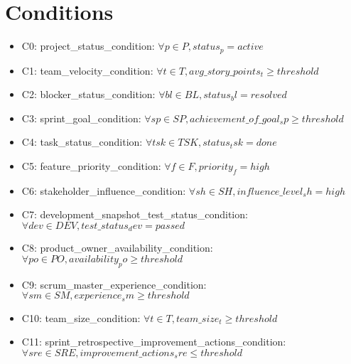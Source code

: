 \documentclass{article}
\begin{document}
\section{Conditions}
\begin{itemize}
    \item C0: project\_status\_condition: $\forall p \in P, status_p = active$
    \item C1: team\_velocity\_condition: $\forall t \in T, avg\_story\_points_t \geq threshold$
    \item C2: blocker\_status\_condition: $\forall bl \in BL, status_bl = resolved$
    \item C3: sprint\_goal\_condition: $\forall sp \in SP, achievement\_of\_goal_sp \geq threshold$
    \item C4: task\_status\_condition: $\forall tsk \in TSK, status_tsk = done$
    \item C5: feature\_priority\_condition: $\forall f \in F, priority_f = high$
    \item C6: stakeholder\_influence\_condition: $\forall sh \in SH, influence\_level_sh = high$
    \item C7: development\_snapshot\_test\_status\_condition: $\forall dev \in DEV, test\_status_dev = passed$
    \item C8: product\_owner\_availability\_condition: $\forall po \in PO, availability_po \geq threshold$
    \item C9: scrum\_master\_experience\_condition: $\forall sm \in SM, experience_sm \geq threshold$
    \item C10: team\_size\_condition: $\forall t \in T, team\_size_t \geq threshold$
    \item C11: sprint\_retrospective\_improvement\_actions\_condition: $\forall sre \in SRE, improvement\_actions_sre \leq threshold$
\end{itemize}
\end{document}

